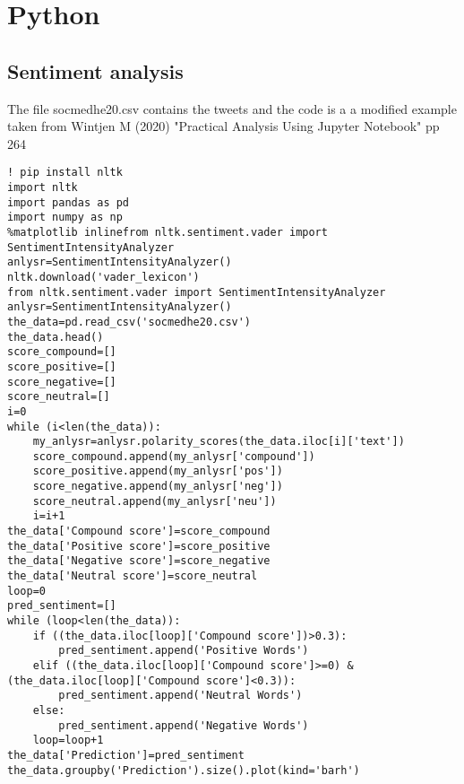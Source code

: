 \chapter{Python}
\section{Sentiment analysis}
The file socmedhe20.csv contains the tweets and the code is a  a modified example taken from Wintjen M (2020) "Practical Analysis Using Jupyter Notebook" pp 264

\begin{verbatim}
! pip install nltk
import nltk
import pandas as pd
import numpy as np
%matplotlib inlinefrom nltk.sentiment.vader import SentimentIntensityAnalyzer
anlysr=SentimentIntensityAnalyzer()
nltk.download('vader_lexicon')
from nltk.sentiment.vader import SentimentIntensityAnalyzer
anlysr=SentimentIntensityAnalyzer()
the_data=pd.read_csv('socmedhe20.csv')
the_data.head()
score_compound=[]
score_positive=[]
score_negative=[]
score_neutral=[]
i=0
while (i<len(the_data)):
    my_anlysr=anlysr.polarity_scores(the_data.iloc[i]['text'])
    score_compound.append(my_anlysr['compound'])
    score_positive.append(my_anlysr['pos'])
    score_negative.append(my_anlysr['neg'])
    score_neutral.append(my_anlysr['neu'])
    i=i+1
the_data['Compound score']=score_compound
the_data['Positive score']=score_positive
the_data['Negative score']=score_negative
the_data['Neutral score']=score_neutral
loop=0
pred_sentiment=[]
while (loop<len(the_data)):
    if ((the_data.iloc[loop]['Compound score'])>0.3):
        pred_sentiment.append('Positive Words')
    elif ((the_data.iloc[loop]['Compound score']>=0) & (the_data.iloc[loop]['Compound score']<0.3)):
        pred_sentiment.append('Neutral Words')
    else:
        pred_sentiment.append('Negative Words')
    loop=loop+1
the_data['Prediction']=pred_sentiment
the_data.groupby('Prediction').size().plot(kind='barh')    
\end{verbatim}
 



